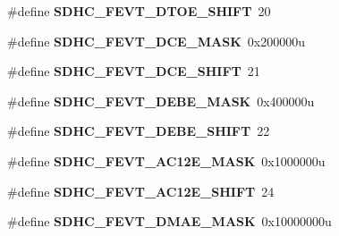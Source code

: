 \begin{DoxyCompactItemize}
\item 
\hypertarget{group___s_d_h_c___register___masks_gad96cef6ac842de516e11f7e9e519408f}{}\#define {\bfseries S\+D\+H\+C\+\_\+\+F\+E\+V\+T\+\_\+\+D\+T\+O\+E\+\_\+\+S\+H\+I\+F\+T}~20\label{group___s_d_h_c___register___masks_gad96cef6ac842de516e11f7e9e519408f}

\item 
\hypertarget{group___s_d_h_c___register___masks_ga544e27b3392401737744fa5a291685e3}{}\#define {\bfseries S\+D\+H\+C\+\_\+\+F\+E\+V\+T\+\_\+\+D\+C\+E\+\_\+\+M\+A\+S\+K}~0x200000u\label{group___s_d_h_c___register___masks_ga544e27b3392401737744fa5a291685e3}

\item 
\hypertarget{group___s_d_h_c___register___masks_gaa4f8f70316d6254d3c69c4a0d767646e}{}\#define {\bfseries S\+D\+H\+C\+\_\+\+F\+E\+V\+T\+\_\+\+D\+C\+E\+\_\+\+S\+H\+I\+F\+T}~21\label{group___s_d_h_c___register___masks_gaa4f8f70316d6254d3c69c4a0d767646e}

\item 
\hypertarget{group___s_d_h_c___register___masks_gac409de67d8fb1f25c2d250922180f666}{}\#define {\bfseries S\+D\+H\+C\+\_\+\+F\+E\+V\+T\+\_\+\+D\+E\+B\+E\+\_\+\+M\+A\+S\+K}~0x400000u\label{group___s_d_h_c___register___masks_gac409de67d8fb1f25c2d250922180f666}

\item 
\hypertarget{group___s_d_h_c___register___masks_ga2524f7345007e20b9788e9b83874c225}{}\#define {\bfseries S\+D\+H\+C\+\_\+\+F\+E\+V\+T\+\_\+\+D\+E\+B\+E\+\_\+\+S\+H\+I\+F\+T}~22\label{group___s_d_h_c___register___masks_ga2524f7345007e20b9788e9b83874c225}

\item 
\hypertarget{group___s_d_h_c___register___masks_gadbf12dd087ee8570d4d9efd31f565bc9}{}\#define {\bfseries S\+D\+H\+C\+\_\+\+F\+E\+V\+T\+\_\+\+A\+C12\+E\+\_\+\+M\+A\+S\+K}~0x1000000u\label{group___s_d_h_c___register___masks_gadbf12dd087ee8570d4d9efd31f565bc9}

\item 
\hypertarget{group___s_d_h_c___register___masks_ga932a5cd108d0f4bf80df9559c2c671e2}{}\#define {\bfseries S\+D\+H\+C\+\_\+\+F\+E\+V\+T\+\_\+\+A\+C12\+E\+\_\+\+S\+H\+I\+F\+T}~24\label{group___s_d_h_c___register___masks_ga932a5cd108d0f4bf80df9559c2c671e2}

\item 
\hypertarget{group___s_d_h_c___register___masks_gad91681b40c16fc4d1fcefe155d3437cb}{}\#define {\bfseries S\+D\+H\+C\+\_\+\+F\+E\+V\+T\+\_\+\+D\+M\+A\+E\+\_\+\+M\+A\+S\+K}~0x10000000u\label{group___s_d_h_c___register___masks_gad91681b40c16fc4d1fcefe155d3437cb}


\end{DoxyCompactItemize}
